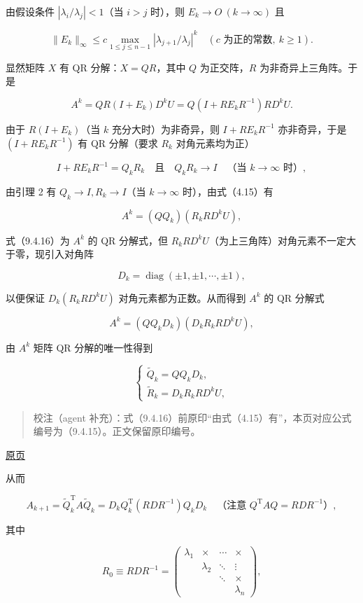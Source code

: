 \documentclass[
  10pt,
  fontset=fandol]{ctexart}
\begin{document}
由假设条件 \(|\lambda_i/\lambda_j|<1\)（当 \(i>j\) 时），则 \(E_k\to O\ (k\to\infty)\) 且

\[
\|E_k\|_\infty\leq c\max_{1\leq j\leq n-1}|\lambda_{j+1}/\lambda_j|^k
\quad(c\text{ 为正的常数},\ k\geq1).
\tag{9.4.14}
\]

显然矩阵 \(X\) 有 QR 分解：\(X=QR\)，其中 \(Q\) 为正交阵，\(R\) 为非奇异上三角阵。于是

\[
A^k=QR(I+E_k)D^kU=Q(I+RE_kR^{-1})RD^kU.
\tag{9.4.15}
\]

由于 \(R(I+E_k)\)（当 \(k\) 充分大时）为非奇异，则 \(I+RE_kR^{-1}\) 亦非奇异，于是 \((I+RE_kR^{-1})\) 有 QR 分解（要求 \(R_k\) 对角元素均为正）

\[
I+RE_kR^{-1}=Q_kR_k\quad\text{且}\quad Q_kR_k\to I\quad\text{（当 }k\to\infty\text{ 时）},
\]

由引理 2 有 \(Q_k\to I,R_k\to I\)（当 \(k\to\infty\) 时），由式（4.15）有

\[
A^k=(QQ_k)(R_kRD^kU),
\tag{9.4.16}
\]

式（9.4.16）为 \(A^k\) 的 QR 分解式，但 \(R_kRD^kU\)（为上三角阵）对角元素不一定大于零，现引入对角阵

\[
D_k=\operatorname{diag}(\pm1,\pm1,\cdots,\pm1),
\]

以便保证 \(D_k(R_kRD^kU)\) 对角元素都为正数。从而得到 \(A^k\) 的 QR 分解式

\[
A^k=(QQ_kD_k)(D_kR_kRD^kU),
\]

由 \(A^k\) 矩阵 QR 分解的唯一性得到

\[
\begin{cases}
\widetilde Q_k=QQ_kD_k,\\
\widetilde R_k=D_kR_kRD^kU,
\end{cases}
\tag{9.4.17}
\]

\begin{quote}
校注（agent 补充）：式（9.4.16）前原印``由式（4.15）有''，本页对应公式编号为（9.4.15）。正文保留原印编号。
\end{quote}

\href{../../source-images/pdf-255.jpeg}{原页}

从而

\[
A_{k+1}=\widetilde Q_k^{\mathrm T}A\widetilde Q_k
=D_kQ_k^{\mathrm T}(RDR^{-1})Q_kD_k
\quad\text{（注意 }Q^{\mathrm T}AQ=RDR^{-1}\text{）},
\]

其中

\[
R_0\equiv RDR^{-1}=\begin{pmatrix}
\lambda_1&\times&\cdots&\times\\
&\lambda_2&\ddots&\vdots\\
&&\ddots&\times\\
&&&\lambda_n
\end{pmatrix},
\]
\end{document}

